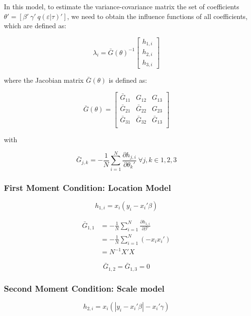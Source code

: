 \documentclass[
  authoryear,
  preprint,
  1p]{elsarticle}
\begin{document}
In this model, to estimate the variance-covariance matrix the set of
coefficients \(\theta'=[\beta' \ \gamma' \ q(\varepsilon|\tau)']\), we
need to obtain the influence functions of all coefficients, which are
defined as:

\[\lambda_i = \bar G(\theta)^{-1}
\begin{bmatrix}
h_{1,i} \\
h_{2,i} \\
h_{3,i}
\end{bmatrix}
\]

where the Jacobian matrix \(\bar G(\theta)\) is defined as:

\[\bar G(\theta) = \begin{bmatrix}
\bar G_{11} & G_{12} & G_{13} \\
\bar G_{21} & \bar G_{22} & G_{23} \\
\bar G_{31} & \bar G_{32} & \bar G_{13} \\
\end{bmatrix}
\]

with

\[\bar G_{j,k} = - \frac 1 N \sum_{i=1}^N \frac{\partial h_{j,i}}{\partial \theta_k'} \ \forall j,k \in 1,2,3
\]

\hypertarget{first-moment-condition-location-model}{%
\subsubsection{First Moment Condition: Location
Model}\label{first-moment-condition-location-model}}

\[h_{1,i}=x_i(y_i-x_i'\beta)\]

\[\begin{aligned}
\bar G_{1,1} &=- \frac{1}{N} \sum_{i=1}^N \frac{\partial h_{1,i}}{\partial \beta'} \\
             &=- \frac{1}{N} \sum_{i=1}^N (-x_i x_i') \\
             &= N^{-1} X'X
\end{aligned}
\]

\[
\bar G_{1,2} = \bar G_{1,3} = 0
\]

\hypertarget{second-moment-condition-scale-model}{%
\subsubsection{Second Moment Condition: Scale
model}\label{second-moment-condition-scale-model}}

\[h_{2,i}=x_i(|y_i-x_i'\beta|-x_i'\gamma)\]
\end{document}
